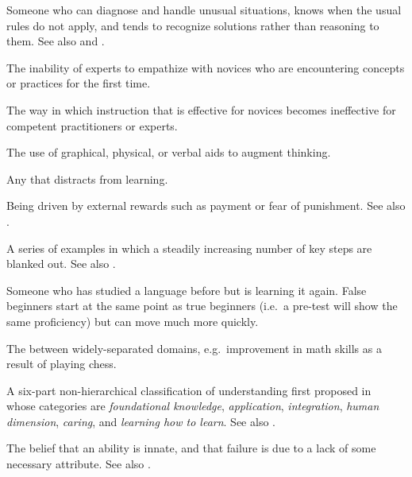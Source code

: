 \begin{description}
 Someone who can diagnose and handle unusual
situations, knows when the usual rules do not apply, and tends to recognize
solutions rather than reasoning to them. See
also 
and .

 The inability of experts to
empathize with novices who are encountering concepts or practices for the first
time.

 The way in which
instruction that is effective for novices becomes ineffective for competent
practitioners or experts.

 The use of graphical,
physical, or verbal aids to augment thinking.

 Any 
that distracts from learning.

 Being driven by external
rewards such as payment or fear of punishment. See
also .

 A series of examples in which a steadily
increasing number of key steps are blanked out. See
also .

 Someone who has studied a language
before but is learning it again. False beginners start at the same point as true
beginners (i.e.\ a pre-test will show the same proficiency) but can move much
more quickly.

 The 
between widely-separated domains, e.g.\ improvement in math skills as a result
of playing chess.

 A six-part non-hierarchical
classification of understanding first proposed in~\cite{Fink2013} whose
categories are \emph{foundational knowledge}, \emph{application},
\emph{integration}, \emph{human dimension}, \emph{caring}, and \emph{learning
  how to learn}. See also .

 The belief that an ability is innate,
and that failure is due to a lack of some necessary attribute. See also
.


\end{description}
